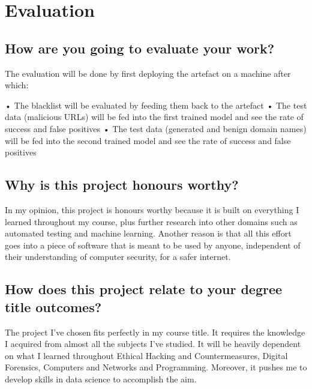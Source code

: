 \tocless\section{Evaluation}
\begin{mdframed}
	\tocless\subsection{How are you going to evaluate your work?}
	The evaluation will be done by first deploying the artefact on a machine after which:

	• The blacklist will be evaluated by feeding them back to the artefact
	• The test data (malicious URLs) will be fed into the first trained model and see the rate of success and false positives
	• The test data (generated and benign domain names) will be fed into the second trained model and see the rate of success and false positives

	\tocless\subsection{Why is this project honours worthy?}
	In my opinion, this project is honours worthy because it is built on everything I learned throughout my course, plus further research into other domains such as automated testing and machine learning. Another reason is that all this effort goes into a piece of software that is meant to be used by anyone, independent of their understanding of computer security, for a safer internet.


	\tocless\subsection{How does this project relate to your degree title outcomes?}
	The project I’ve chosen fits perfectly in my course title. It requires the knowledge I acquired from almost all the subjects I’ve studied. It will be heavily dependent on what I learned throughout Ethical Hacking and Countermeasures, Digital Forensics, Computers and Networks and Programming. Moreover, it pushes me to develop skills in data science to accomplish the aim.
\end{mdframed}
